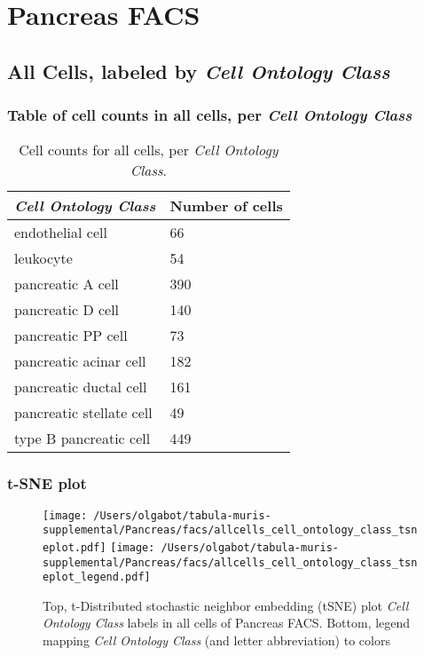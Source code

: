 \clearpage
\section{Pancreas FACS}

\subsection{All Cells, labeled by \emph{Cell Ontology Class}}
\subsubsection{Table of cell counts in all cells, per \emph{Cell Ontology Class}}\begin{table}[h]
\centering
\label{my-label}
\begin{tabular}{@{}ll@{}}
\toprule

\emph{Cell Ontology Class}& Number of cells \\ \midrule
endothelial cell & 66 \\

leukocyte & 54 \\

pancreatic A cell & 390 \\

pancreatic D cell & 140 \\

pancreatic PP cell & 73 \\

pancreatic acinar cell & 182 \\

pancreatic ductal cell & 161 \\

pancreatic stellate cell & 49 \\

type B pancreatic cell & 449 \\
\bottomrule
\end{tabular}
\caption{Cell counts for all cells, per \emph{Cell Ontology Class}.}
\end{table}

\clearpage
\subsubsection{t-SNE plot}
\begin{figure}[h]
\centering
\texttt{[image: /Users/olgabot/tabula-muris-supplemental/Pancreas/facs/allcells\_cell\_ontology\_class\_tsneplot.pdf]}
\texttt{[image: /Users/olgabot/tabula-muris-supplemental/Pancreas/facs/allcells\_cell\_ontology\_class\_tsneplot\_legend.pdf]}
\caption{Top, t-Distributed stochastic neighbor embedding (tSNE) plot  \emph{Cell Ontology Class} labels in all cells of Pancreas FACS. Bottom, legend mapping \emph{Cell Ontology Class} (and letter abbreviation) to colors}
\end{figure}


